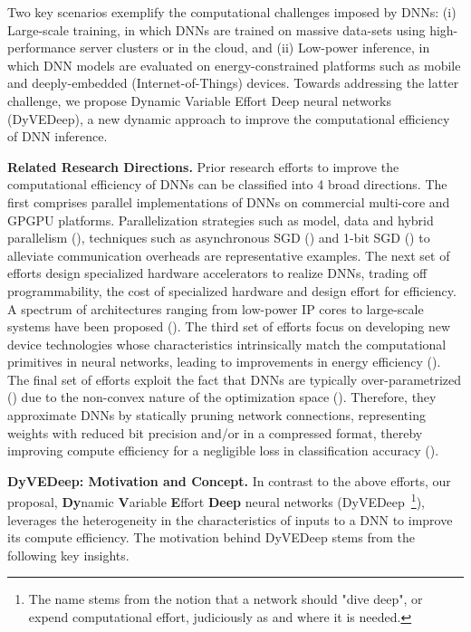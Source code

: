 \documentclass{article} %
\begin{document}
Two key scenarios exemplify the computational challenges imposed by DNNs: (i) Large-scale training, in which DNNs are trained on massive data-sets using high-performance server clusters or in the cloud, and (ii) Low-power inference, in which DNN models are evaluated on energy-constrained platforms such as mobile and deeply-embedded (Internet-of-Things) devices. Towards addressing the latter challenge, we propose Dynamic Variable Effort Deep neural networks (DyVEDeep), a new dynamic approach to improve the computational efficiency of DNN inference. 

{\bf \noindent Related Research Directions.} Prior research efforts to improve the computational efficiency of DNNs can be classified into 4 broad directions. The first comprises parallel implementations of DNNs on commercial multi-core and GPGPU platforms. Parallelization strategies such as model, data and hybrid parallelism (\cite{DBLP:journals/corr/Krizhevsky14,DBLP:journals/corr/0002AMVSKKD16}), techniques such as asynchronous SGD (\cite{40565}) and 1-bit SGD (\cite{1bit}) to alleviate communication overheads  are representative examples. The next set of efforts design specialized hardware accelerators to realize DNNs, trading off programmability, the cost of specialized hardware and design effort for efficiency. A spectrum of architectures ranging from low-power IP cores to large-scale systems have been proposed (\cite{5981829,Chen:2014:DMS:2742155.2742217,TPU}). The third set of efforts focus on developing new device technologies whose characteristics intrinsically match the computational primitives in neural networks, leading to improvements in energy efficiency (\cite{Liu:2015:RHR:2744769.2744900, Ramasubramanian:2014:SSD:2627369.2627625}). The final set of efforts exploit the fact that DNNs are typically over-parametrized (\cite{DBLP:conf/nips/DenilSDRF13}) due to the non-convex nature of the optimization space (\cite{DBLP:journals/corr/abs-1207-0580}). Therefore, they approximate DNNs by statically pruning network connections, representing weights with reduced bit precision and/or in a compressed format, thereby improving compute efficiency for a negligible loss in classification accuracy (\cite{DBLP:conf/nips/CunDS89,DBLP:journals/corr/HanPTD15,DBLP:conf/interspeech/LiuZW14,Venkataramani:2014:AEN:2627369.2627613,DBLP:conf/icassp/AnwarHS15,DBLP:conf/icassp/TanS16}).

{\bf \noindent DyVEDeep: Motivation and Concept.} In contrast to the above efforts, our proposal, {\bf Dy}namic {\bf V}ariable {\bf E}ffort {\bf Deep} neural networks (DyVEDeep~\footnote{The name stems from the notion that a network should "dive deep", or expend computational effort, judiciously as and where it is needed.}), leverages the heterogeneity in the characteristics of inputs to a DNN to improve its compute efficiency. The motivation behind DyVEDeep stems from the following key insights. 
\end{document}
